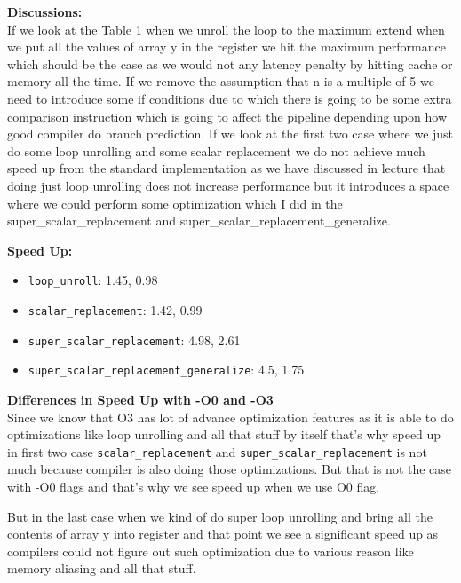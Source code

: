\documentclass[letterpaper, 11pt]{article}
\begin{document}
\textbf{Discussions:} \\
If we look at the Table 1 when we unroll the loop to the maximum extend when we put all the values of array y in the register we hit the maximum performance which should be the case as we would not any latency penalty by hitting cache or memory all the time. If we remove the assumption that n is a multiple of 5 we need to introduce some if conditions due to which there is going to be some extra comparison instruction which is going to affect the pipeline depending upon how good compiler do branch prediction. If we look at the first two case where we just do some loop unrolling and some scalar replacement we do not achieve much speed up from the standard implementation as we have discussed in lecture that doing just loop unrolling does not increase performance but it introduces a space where we could perform some optimization which I did in the super\_scalar\_replacement and super\_scalar\_replacement\_generalize.

\textbf{Speed Up:}
\begin{itemize}
\item \texttt{loop\_unroll}: 1.45, 0.98
\item \texttt{scalar\_replacement}: 1.42, 0.99
\item \texttt{super\_scalar\_replacement}: 4.98, 2.61
\item \texttt{super\_scalar\_replacement\_generalize}: 4.5, 1.75
\end{itemize}

\textbf{Differences in Speed Up with -O0 and -O3}\\
Since we know that O3 has lot of advance optimization features as it is able to do optimizations like loop unrolling and all that  stuff by itself that's why speed up in first two case \texttt{scalar\_replacement} and \texttt{super\_scalar\_replacement} is not much because compiler is also doing those optimizations. But that is not the case with -O0 flags and that's why we see speed up when we use O0 flag. 

But in the last case when we kind of do super loop unrolling and bring all the contents of array y into register and that point we see a significant speed up as compilers could not figure out such optimization due to various reason like memory aliasing and all that stuff.

\bigskip
\end{document}
